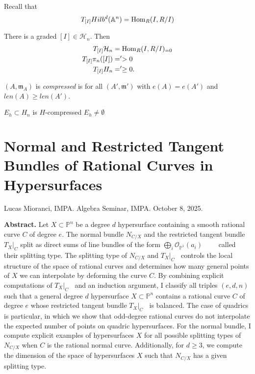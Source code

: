 Recall that
$$
T_{[I]}Hilb^d(\mathbb{A}^n)=\mathop{\mathrm{Hom}}\nolimits_R(I,R/I)
$$
\begin{theorem}[B-B,J,G G G L]
\label{theorem-B-B-J-G-G-G-L}
There is a graded $[I] \in \mathcal{H}_n$.
Then
$$
\begin{aligned}
T_{[I]}\mathcal{H}_n&=\mathop{\mathrm{Hom}}\nolimits_R(I,R/I)_{=0}\\
T_{[I]}\pi_n([I])&='>0\\
T_{[I]}H_n&=' \geq 0.
\end{aligned}
$$
\end{theorem}

\begin{definition}
\label{definition-compressed}
$(A,\mathfrak{m}_A)$ is {\it compressed} is
for all  $(A',\mathfrak{m}')$
with $e(A)=e(A')$ and $len(A) \geq  len(A')
$.
\end{definition}

\begin{theorem}
\label{theorem-E}
$E_h \subset H_n$ is $H$-compressed
$E_h \neq  \emptyset$
\end{theorem}

\section{Normal and Restricted Tangent
Bundles of Rational
Curves in Hypersurfaces}
\label{section-restricted-tangent-bundles}

\noindent
Lucas Mioranci, IMPA.
Algebra Seminar, IMPA.
October 8, 2025.

\medskip\noindent
{\bf Abstract.}
Let $X\subset \mathbb{P}^n$ be a degree $d$
hypersurface containing a smooth
rational curve $C$ of degree $e$. The normal
bundle $N_{C/X}$ and the restricted
tangent bundle $T_X|_C$ split as direct sums
of line bundles of the form
$\bigoplus_i
\mathcal{O}_{\mathbb{P}^1}(a_i)\qquad$ called
their splitting type.
The splitting type of $N_{C/X}$ and
${T_X}|_C\;\;$ controls the local structure
of the space of rational curves and
determines how many general points of $X$ we
can interpolate by deforming the curve $C$.
By combining explicit computations
of $T_X|_C\;\;$ and an induction argument, I
classify all triples $(e,d,n)$ such
that a general degree $d$ hypersurface
$X\subset \mathbb{P}^n$ contains a
rational curve $C$ of degree $e$ whose
restricted tangent bundle ${T_X}|_C\;\;$
is balanced. The case of quadrics is
particular, in which we show that
odd-degree rational curves do not interpolate
the expected number of points on
quadric hypersurfaces.  For the normal
bundle, I compute explicit examples of
hypersurfaces $X$ for all possible splitting
types of $N_{C/X}$ when $C$ is the
rational normal curve. Additionally, for
$d\ge 3$, we compute the dimension of
the space of hypersurfaces $X$ such that
$N_{C/X}$ has a given splitting type.




